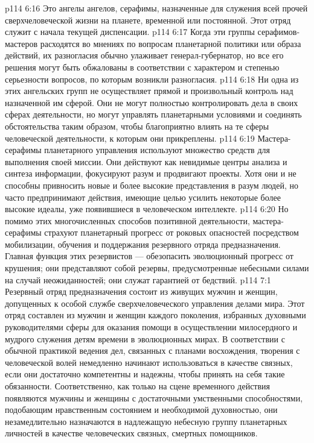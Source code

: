 \vs p114 6:16 \pc {}\bibnobreakspace {} Это ангелы ангелов, серафимы, назначенные для служения всей прочей сверхчеловеческой жизни на планете, временной или постоянной. Этот отряд служит с начала текущей диспенсации.
\vs p114 6:17 \pc Когда эти группы серафимов\hyp{}мастеров расходятся во мнениях по вопросам планетарной политики или образа действий, их разногласия обычно улаживает генерал\hyp{}губернатор, но все его решения могут быть обжалованы в соответствии с характером и степенью серьезности вопросов, по которым возникли разногласия.
\vs p114 6:18 Ни одна из этих ангельских групп не осуществляет прямой и произвольный контроль над назначенной им сферой. Они не могут полностью контролировать дела в своих сферах деятельности, но могут управлять планетарными условиями и соединять обстоятельства таким образом, чтобы благоприятно влиять на те сферы человеческой деятельности, к которым они прикреплены.
\vs p114 6:19 Мастера\hyp{}серафимы планетарного управления используют множество средств для выполнения своей миссии. Они действуют как невидимые центры анализа и синтеза информации, фокусируют разум и продвигают проекты. Хотя они и не способны привносить новые и более высокие представления в разум людей, но часто предпринимают действия, имеющие целью усилить некоторые более высокие идеалы, уже появившиеся в человеческом интеллекте.
\vs p114 6:20 Но помимо этих многочисленных способов позитивной деятельности, мастера\hyp{}серафимы страхуют планетарный прогресс от роковых опасностей посредством мобилизации, обучения и поддержания резервного отряда предназначения. Главная функция этих резервистов --- обезопасить эволюционный прогресс от крушения; они представляют собой резервы, предусмотренные небесными силами на случай неожиданностей; они служат гарантией от бедствий.
\vs p114 7:1 Резервный отряд предназначения состоит из живущих мужчин и женщин, допущенных к особой службе сверхчеловеческого управления делами мира. Этот отряд составлен из мужчин и женщин каждого поколения, избранных духовными руководителями сферы для оказания помощи в осуществлении милосердного и мудрого служения детям времени в эволюционных мирах. В соответствии с обычной практикой ведения дел, связанных с планами восхождения, творения с человеческой волей немедленно начинают использоваться в качестве связных, если они достаточно компетентны и надежны, чтобы принять на себя такие обязанности. Соответственно, как только на сцене временного действия появляются мужчины и женщины с достаточными умственными способностями, подобающим нравственным состоянием и необходимой духовностью, они незамедлительно назначаются в надлежащую небесную группу планетарных личностей в качестве человеческих связных, смертных помощников.
